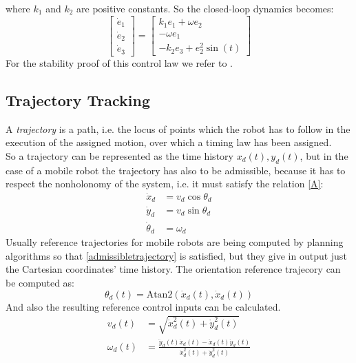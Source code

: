 where $k_1$ and $k_2$ are positive constants. So the closed-loop dynamics becomes:
\begin{equation}
	\left[\begin{matrix}
	\dot{e}_1\\\dot{e}_2\\\dot{e}_3
	\end{matrix}\right] = 
	\left[\begin{matrix}
	k_1e_1+\omega e_2\\-\omega e_1\\-k_2e_3+e_2^2\sin(t)
	\end{matrix}\right]
\end{equation}
For the stability proof of this control law we refer to \cite{dixon}.
\subsection{Trajectory Tracking}
A \textit{trajectory} is a path, i.e. the locus of points which the robot has to follow in the execution of the assigned motion, over which a timing law has been assigned. \\
So a trajectory can be represented as the time history $x_d(t),y_d(t)$, but in the case of a mobile robot the trajectory has also to be admissible, because it has to respect the nonholonomy of the system, i.e. it must satisfy the relation \ref{A}:
\begin{equation} \label{admissibletrajectory}
	\begin{split}
		\dot{x}_d &= v_d\cos\theta_d\\
		\dot{y}_d &= v_d\sin\theta_d\\
		\dot{\theta}_d&=\omega_d
	\end{split}
\end{equation}
Usually reference trajectories for mobile robots are being computed by planning algorithms so that \ref{admissibletrajectory} is satisfied, but they give in output just the Cartesian coordinates' time history. The orientation reference trajecory can be computed as:
\begin{equation}
	\theta_d(t)=\text{Atan2}(\dot{x}_d(t),\dot{x}_d(t)) 
\end{equation}
 And also the resulting reference control inputs can be calculated.
 \begin{align}
 	v_d(t)&=\sqrt{\dot{x}_d^2(t)+\dot{y}_d^2(t)}\\
 	\omega_d(t)&=\frac{\ddot{y}_d(t)\dot{x}_d(t)-\ddot{x}_d(t)\dot{y}_d(t)}{\dot{x}^2_d(t)+\dot{y}^2_d(t)}
 \end{align}
